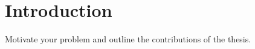 
\chapter{Introduction}
\label{sec:introduction}

Motivate your problem and outline the contributions of the thesis.\cite{mattern2010ict}
